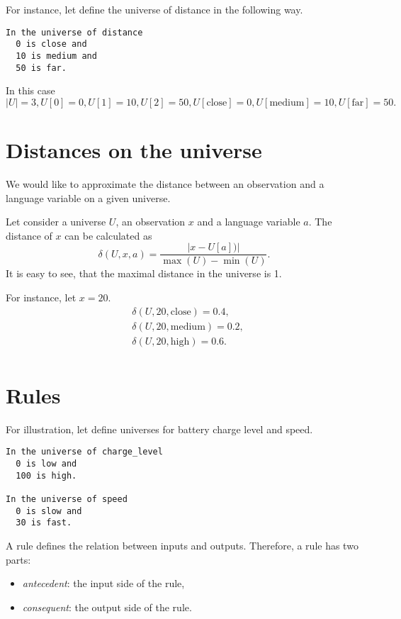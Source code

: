 \documentclass[a4paper,12pt]{article}
\begin{document}
For instance, let define the universe of distance in the following way.

\begin{verbatim}
In the universe of distance
  0 is close and
  10 is medium and
  50 is far.
\end{verbatim}

In this case
\[
|U| = 3, U[0] = 0, U[1] = 10, U[2] = 50, U[\text{close}] = 0, U[\text{medium}] = 10, U[\text{far}] = 50.
\]

\section{Distances on the universe}

We would like to approximate the distance between an observation and a language variable on a given universe.

Let consider a universe $U$, an observation $x$ and a language variable $a$.
The distance of $x$ can be calculated as
\[
\delta(U, x, a) =
\dfrac{|x - U[a])|}{\max(U) - \min(U)}.
\]
It is easy to see, that the maximal distance in the universe is 1.

For instance, let $x = 20$.
\begin{align*}
&\delta(U, 20, \text{close}) = 0.4, \\
&\delta(U, 20, \text{medium}) = 0.2, \\
&\delta(U, 20, \text{high}) = 0.6. \\
\end{align*}

\section{Rules}

For illustration, let define universes for battery charge level and speed.
\begin{verbatim}
In the universe of charge_level
  0 is low and
  100 is high.

In the universe of speed
  0 is slow and
  30 is fast.
\end{verbatim}

A rule defines the relation between inputs and outputs. Therefore, a rule has two parts:
\begin{itemize}
    \item \textit{antecedent}: the input side of the rule,
    \item \textit{consequent}: the output side of the rule.
\end{itemize}
\end{document}
